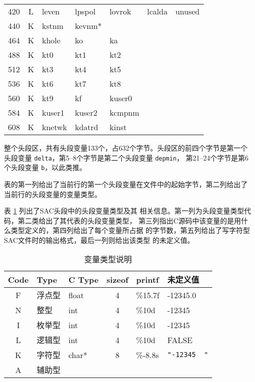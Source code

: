\begin{table}[H]
\begin{tabular}{c|c|lllll}
420		&	L	&	leven	&	lpspol	&	lovrok	&	lcalda	&	unused	\\
440		&	K	&	kstnm	&	kevnm*	&			&			&			\\
464		&	K	&	khole	&	ko		&	ka		&			&			\\
488		&	K	&	kt0		&	kt1		&	kt2		&			&			\\
512		&	K	&	kt3		&	kt4		&	kt5		&			&			\\
536		&	K	&	kt6		&	kt7		&	kt8		&			&			\\
560		&	K	&	kt9		&	kf		&	kuser0	&			&			\\
584		&	K	&	kuser1	&	kuser2	&	kcmpnm	&			&			\\
608		&	K	&	knetwk	&	kdatrd	&	kinst	&			&			\\
\bottomrule
\end{tabular}
\end{table}

整个头段区，共有头段变量133个，占632个字节。头段区的前四个字节是第一个
头段变量 \texttt{delta}，第5--8个字节是第二个头段变量 \texttt{depmin}，
第21--24个字节是第6个头段变量 \texttt{b}，以此类推。

表的第一列给出了当前行的第一个头段变量在文件中的起始字节，第二列给出了
当前行的头段变量的变量类型。

表 \ref{table:header-variables-type} 列出了SAC头段中的头段变量类型及其
相关信息。第一列为头段变量类型代码，第二类给出了其代表的头段变量类型，
第三列指出C源码中该变量的是用什么类型定义的，第四列给出了每个变量所占据
的字节数，第五列给出了写字符型SAC文件时的输出格式，最后一列则给出该类型
的未定义值。

\begin{table}[H]
\caption{变量类型说明}
\label{table:header-variables-type}
\centering
\ttfamily
\small
\begin{tabular}{cllcll}
\toprule
Code    &	Type        &   C Type & sizeof &   printf	&   未定义值        \\
\midrule
F		&	浮点型		&   float  &  4     &	\%15.7f &   -12345.0        \\
N		&	整型		&   int    &  4     &	\%10d   &   -12345        \\
I		&	枚举型		&   int    &  4     &	\%10d   &   -12345	        \\
L		&	逻辑型		&   int    &  4     &	\%10d   &   FALSE        \\
K		&	字符型		&   char*  &  8     &	\%-8.8s & \lstinline[showspaces=true]!"-12345  "!     \\
A		&	辅助型		&          &        &			& 	    \\
\bottomrule
\end{tabular}
\end{table}

